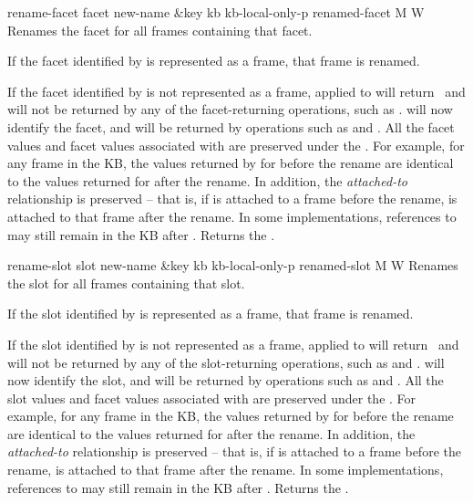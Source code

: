 \begin{okbcop}{rename-facet}{ facet new-name \&key kb kb-local-only-p} { renamed-facet } { M } { W } {  }
Renames the facet for all frames containing that facet.
   \bitem
   \item If the facet identified by  is represented as a frame,
          that frame is renamed.
   \item If the facet identified by  is not represented as
          a frame,  applied to  will return
          \false\, and  will not be returned by any of
          the facet-returning operations, such as .
           will now identify the
          facet, and will be returned by operations such as
           and .
   \eitem
   All the facet values and facet values associated with  are
   preserved under the .  For example, for any frame in
   the KB, the values returned by  for 
   before the rename are identical to the values returned  for
    after the rename.  In addition, the {\em attached-to}
   relationship is preserved -- that is, if  is attached to a
   frame before the rename,  is attached to that frame
   after the rename.  In some implementations, references to 
   may still remain in the KB after .  Returns the
   .
\end{okbcop}

\begin{okbcop}{rename-slot}{ slot new-name \&key kb kb-local-only-p} { renamed-slot } { M } { W } {  }
Renames the slot for all frames containing that slot.
   \bitem
   \item If the slot identified by  is represented as a frame,
          that frame is renamed.
   \item If the slot identified by  is not represented as
          a frame,  applied to  will return \false\,
          and  will not be returned by any of the slot-returning
          operations, such as  and .
           will now identify the slot, and will be returned by
          operations such as  and .
   \eitem
   All the slot values and facet values associated with  are
   preserved under the .  For example, for any frame in
   the KB, the values returned by  for 
   before the rename are identical to the values returned  for
    after the rename.  In addition, the {\em attached-to}
   relationship is preserved -- that is, if  is attached to a
   frame before the rename,  is attached to that frame
   after the rename.  In some implementations, references to 
   may still remain in the KB after .  Returns the
   .
\end{okbcop}


